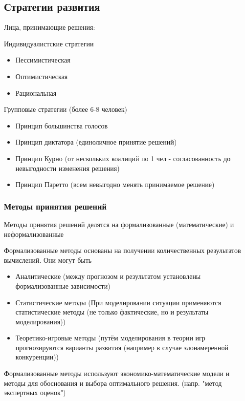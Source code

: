 \documentclass[a4paper,12pt]{report}
\begin{document}
	\subsection{Стратегии развития}
	Лица, принимающие решения:

	Индивидуалистские стратегии
	\begin{itemize}
		\item Пессимистическая
		\item Оптимистическая
		\item Рациональная
	\end{itemize}

		Групповые стратегии (более 6-8 человек)
	\begin{itemize}
		\item Принцип большинства голосов
		\item Принцип диктатора (единоличное принятие решений)
		\item Принцип Курно (от нескольких коалиций по 1 чел - согласованность до невыгодности изменения решения)
		\item Принцип Паретто (всем невыгодно менять принимаемое решение)
	\end{itemize}

\subsubsection{Методы принятия решений}


	Методы принятия решений делятся на формализованные (математические) и неформализованные

	Формализованные методы основаны на получении количественных результатов вычислений.
	Они могут быть
	\begin{itemize}
		\item Аналитические (между прогнозом и результатом установлены формализованные зависимости)
		\item Статистические методы (При моделировании ситуации применяются статистические методы (не только фактические, но и результаты моделирования))
		\item Теоретико-игровые методы (путём моделирования в теории игр прогнозируются варианты развития (например в случае злонамеренной конкуренции))
	\end{itemize}

	Формализованные методы используют экономико-математические модели и методы для обоснования и выбора оптимального решения. (напр. "метод экспертных оценок")
\end{document}
